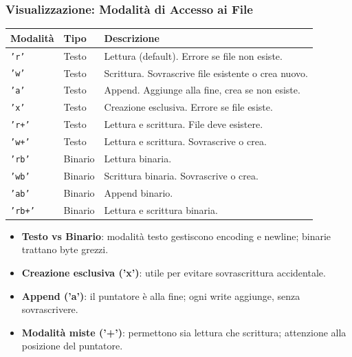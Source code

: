 \subsubsection{Visualizzazione: Modalità di Accesso ai File}
\begin{center}
\begin{tabular}{|l|l|p{6cm}|}
\hline
\textbf{Modalità} & \textbf{Tipo} & \textbf{Descrizione} \\
\hline
\texttt{'r'} & Testo & Lettura (default). Errore se file non esiste. \\
\hline
\texttt{'w'} & Testo & Scrittura. Sovrascrive file esistente o crea nuovo. \\
\hline
\texttt{'a'} & Testo & Append. Aggiunge alla fine, crea se non esiste. \\
\hline
\texttt{'x'} & Testo & Creazione esclusiva. Errore se file esiste. \\
\hline
\texttt{'r+'} & Testo & Lettura e scrittura. File deve esistere. \\
\hline
\texttt{'w+'} & Testo & Lettura e scrittura. Sovrascrive o crea. \\
\hline
\texttt{'rb'} & Binario & Lettura binaria. \\
\hline
\texttt{'wb'} & Binario & Scrittura binaria. Sovrascrive o crea. \\
\hline
\texttt{'ab'} & Binario & Append binario. \\
\hline
\texttt{'rb+'} & Binario & Lettura e scrittura binaria. \\
\hline
\end{tabular}
\end{center}

\begin{tcolorbox}[title=Note sulle modalità]
\begin{itemize}
  \item \textbf{Testo vs Binario}: modalità testo gestiscono encoding e newline; binarie trattano byte grezzi.
  \item \textbf{Creazione esclusiva ('x')}: utile per evitare sovrascrittura accidentale.
  \item \textbf{Append ('a')}: il puntatore è alla fine; ogni write aggiunge, senza sovrascrivere.
  \item \textbf{Modalità miste ('+')}: permettono sia lettura che scrittura; attenzione alla posizione del puntatore.
\end{itemize}
\end{tcolorbox}

